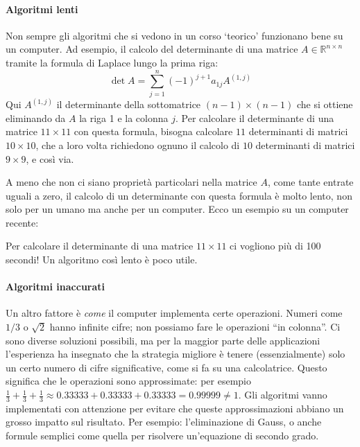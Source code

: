 \documentclass[a4paper]{report}
\theoremstyle{definition}
\theoremstyle{remark}
\begin{document}
\paragraph{Algoritmi lenti} Non sempre gli algoritmi che si vedono in un corso `teorico' funzionano bene su un computer. Ad esempio, il calcolo del determinante di una matrice $A \in \mathbb{R}^{n\times n}$ tramite la formula di Laplace lungo la prima riga:
\[
    \det A = \sum_{j=1}^n (-1)^{j+1} a_{1j} A^{(1,j)}
\]
Qui $A^{(1,j)}$ il determinante della sottomatrice $(n-1)\times (n-1)$ che si ottiene eliminando da $A$ la riga 1 e la colonna $j$. Per calcolare il determinante di una matrice $11\times 11$ con questa formula, bisogna calcolare $11$ determinanti di matrici $10\times 10$, che a loro volta richiedono ognuno il calcolo di $10$ determinanti di matrici $9\times 9$, e così via.

A meno che non ci siano proprietà particolari nella matrice $A$, come tante entrate uguali a zero, il calcolo di un determinante con questa formula è molto lento, non solo per un umano ma anche per un computer. Ecco un esempio su un computer recente:
\begin{center}
\end{center}
Per calcolare il determinante di una matrice $11\times 11$ ci vogliono più di 100 secondi! Un algoritmo così lento è poco utile.

\paragraph{Algoritmi inaccurati} Un altro fattore è \emph{come} il computer implementa certe operazioni. Numeri come $1/3$ o $\sqrt{2}$ hanno infinite cifre; non possiamo fare le operazioni ``in colonna''. Ci sono diverse soluzioni possibili, ma per la maggior parte delle applicazioni l'esperienza ha insegnato che la strategia migliore è tenere (essenzialmente) solo un certo numero di cifre significative, come si fa su una calcolatrice. Questo significa che le operazioni sono approssimate: per esempio $\frac13 + \frac13 + \frac13 \approx 0.33333 + 0.33333 + 0.33333 = 0.99999 \neq 1$. Gli algoritmi vanno implementati con attenzione per evitare che queste approssimazioni abbiano un grosso impatto sul risultato. Per esempio: l'eliminazione di Gauss, o anche formule semplici come quella per risolvere un'equazione di secondo grado.
\end{document}
